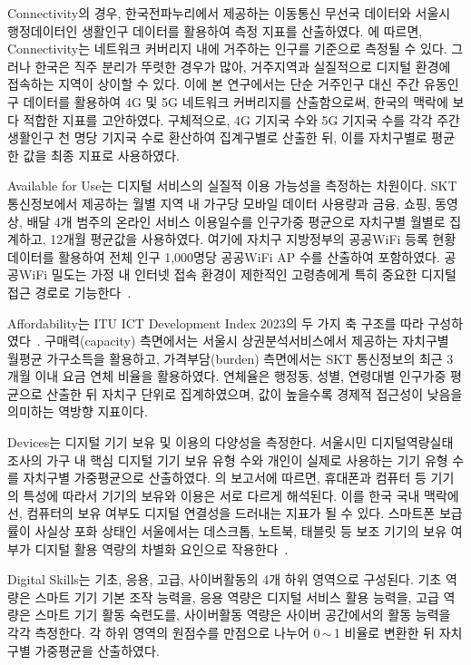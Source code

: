 Connectivity의 경우, 한국전파누리에서 제공하는 이동통신 무선국 데이터와 서울시 행정데이터인 생활인구 데이터를 활용하여 측정 지표를 산출하였다. \citet{ITU2023}에 따르면, Connectivity는 네트워크 커버리지 내에 거주하는 인구를 기준으로 측정될 수 있다. 그러나 한국은 직주 분리가 뚜렷한 경우가 많아, 거주지역과 실질적으로 디지털 환경에 접속하는 지역이 상이할 수 있다. 이에 본 연구에서는 단순 거주인구 대신 주간 유동인구 데이터를 활용하여 4G 및 5G 네트워크 커버리지를 산출함으로써, 한국의 맥락에 보다 적합한 지표를 고안하였다. 구체적으로, 4G 기지국 수와 5G 기지국 수를 각각 주간 생활인구 천 명당 기지국 수로 환산하여 집계구별로 산출한 뒤, 이를 자치구별로 평균한 값을 최종 지표로 사용하였다.

Available for Use는 디지털 서비스의 실질적 이용 가능성을 측정하는 차원이다. SKT 통신정보에서 제공하는 월별 지역 내 가구당 모바일 데이터 사용량과 금융, 쇼핑, 동영상, 배달 4개 범주의 온라인 서비스 이용일수를 인구가중 평균으로 자치구별 월별로 집계하고, 12개월 평균값을 사용하였다. 여기에 자치구 지방정부의 공공WiFi 등록 현황 데이터를 활용하여 전체 인구 1,000명당 공공WiFi AP 수를 산출하여 포함하였다. 공공WiFi 밀도는 가정 내 인터넷 접속 환경이 제한적인 고령층에게 특히 중요한 디지털 접근 경로로 기능한다~\citep{vanDijk2020}.

Affordability는 ITU ICT Development Index 2023의 두 가지 축 구조를 따라 구성하였다~\citep{ITU2024}. 구매력(capacity) 측면에서는 서울시 상권분석서비스에서 제공하는 자치구별 월평균 가구소득을 활용하고, 가격부담(burden) 측면에서는 SKT 통신정보의 최근 3개월 이내 요금 연체 비율을 활용하였다. 연체율은 행정동, 성별, 연령대별 인구가중 평균으로 산출한 뒤 자치구 단위로 집계하였으며, 값이 높을수록 경제적 접근성이 낮음을 의미하는 역방향 지표이다.

Devices는 디지털 기기 보유 및 이용의 다양성을 측정한다. 서울시민 디지털역량실태조사의 가구 내 핵심 디지털 기기 보유 유형 수와 개인이 실제로 사용하는 기기 유형 수를 자치구별 가중평균으로 산출하였다. \citet{ITU2023}의 보고서에 따르면, 휴대폰과 컴퓨터 등 기기의 특성에 따라서 기기의 보유와 이용은 서로 다르게 해석된다. 이를 한국 국내 맥락에선, 컴퓨터의 보유 여부도 디지털 연결성을 드러내는 지표가 될 수 있다. 스마트폰 보급률이 사실상 포화 상태인 서울에서는 데스크톱, 노트북, 태블릿 등 보조 기기의 보유 여부가 디지털 활용 역량의 차별화 요인으로 작용한다~\citep{vanDeursenHelsper2015}.

Digital Skills는 기초, 응용, 고급, 사이버활동의 4개 하위 영역으로 구성된다. 기초 역량은 스마트 기기 기본 조작 능력을, 응용 역량은 디지털 서비스 활용 능력을, 고급 역량은 스마트 기기 활동 숙련도를, 사이버활동 역량은 사이버 공간에서의 활동 능력을 각각 측정한다. 각 하위 영역의 원점수를 만점으로 나누어 0\,$\sim$\,1 비율로 변환한 뒤 자치구별 가중평균을 산출하였다.

